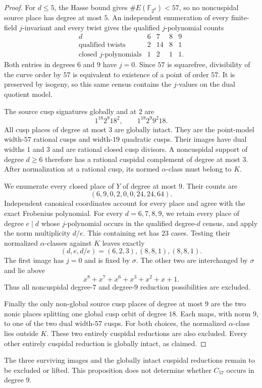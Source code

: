 \begin{proof}
For $d\leq5$, the Hasse bound gives
$\#E(\mathbb F_{2^d})<57$, so no noncuspidal source place
has degree at most $5$. An independent enumeration of every
finite-field $j$-invariant and every twist gives the qualified
$j$-polynomial counts
\[
\begin{array}{c|rrrr}
 d&6&7&8&9\\ \hline
 \text{qualified twists}&2&14&8&1\\
 \text{closed }j\text{-polynomials}&1&2&1&1.
\end{array}
\]
Both entries in degrees $6$ and $9$ have $j=0$.
Since $57$ is squarefree, divisibility of the curve order by
$57$ is equivalent to existence of a point of order $57$.
It is preserved by isogeny, so this same census contains the
$j$-values on the dual quotient model.

The source cusp signatures globally and at $2$ are
\[
 1^{18}2^9 18^2,\qquad 1^{18}2^9 9^2 18.
\]
All cusp places of degree at most $3$ are globally intact.
They are the point-model width-$57$ rational cusps and
width-$19$ quadratic cusps. Their images have dual widths
$1$ and $3$ and are rational closed cusp divisors.
A noncuspidal support of degree $d\geq6$ therefore has a
rational cuspidal complement of degree at most $3$.
After normalization at a rational cusp, its normed $\alpha$-class
must belong to $K$.

We enumerate every closed place of $Y$ of degree at most $9$.
Their counts are
\[
 (6,9,0,2,0,0,24,24,64).
\]
Independent canonical coordinates account for every place and
agree with the exact Frobenius polynomial.
For every $d=6,7,8,9$, we retain every place of degree $e\mid d$
whose $j$-polynomial occurs in the qualified degree-$d$ census,
and apply the norm multiplicity $d/e$.
This containing set has $23$ cases. Testing their normalized
$\alpha$-classes against $K$ leaves exactly
\[
 (d,e,d/e)=(6,2,3),(8,8,1),(8,8,1).
\]
The first image has $j=0$ and is fixed by $\sigma$.
The other two are interchanged by $\sigma$ and lie above
\[
 x^8+x^7+x^6+x^3+x^2+x+1.
\]
Thus all noncuspidal degree-$7$ and degree-$9$ reduction
possibilities are excluded.

Finally the only non-global source cusp places of degree at
most $9$ are the two nonic places splitting one global
cusp orbit of degree $18$. Each maps, with norm $9$, to one of
the two dual width-$57$ cusps.
For both choices, the normalized $\alpha$-class lies outside $K$.
These two entirely cuspidal reductions are also excluded.
Every other entirely cuspidal reduction is globally intact,
as claimed.
\end{proof}

The three surviving images and the globally intact cuspidal
reductions remain to be excluded or lifted. This proposition
does not determine whether $C_{57}$ occurs in degree $9$.
